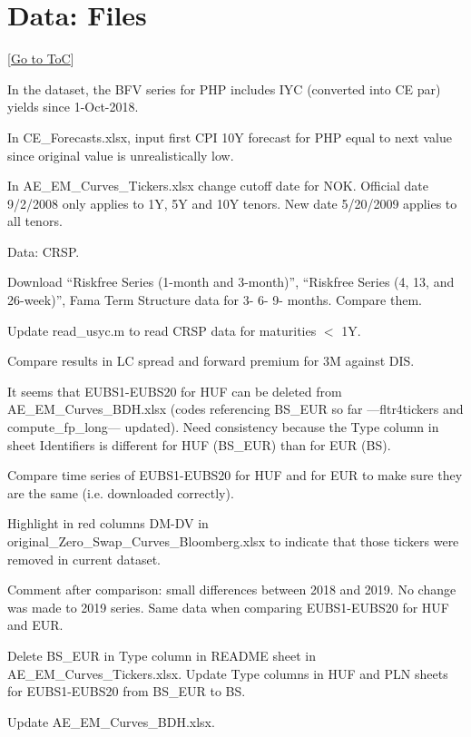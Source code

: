 \documentclass[12pt]{article}
\newcommand{\gototoc}{\vspace{-1.8cm} \null\hfill [\hyperlink{toc}{Go to ToC}] \newline}
\newcommand{\cmark}{\ding{51}}
\newcommand{\done}{\rlap{$\square$}{\raisebox{2pt}{\large\hspace{1pt}\cmark}}%
	\hspace{-2.5pt}}
\begin{document}
\section{Data: Files}
\gototoc
\begin{todolist}
	\item[\done] In the dataset, the BFV series for PHP includes IYC (converted into CE par) yields since 1-Oct-2018. 
	\item[\done] In CE_Forecasts.xlsx, input first CPI 10Y forecast for PHP equal to next value since original value is unrealistically low.
	\item[\done] In AE_EM_Curves_Tickers.xlsx change cutoff date for NOK. Official date 9/2/2008 only applies to 1Y, 5Y and 10Y tenors. New date 5/20/2009 applies to all tenors.
	\item[\done] Data: CRSP.
	\begin{todolist}
		\item[\done] Download “Riskfree Series (1-month and 3-month)”, “Riskfree Series (4, 13, and 26-week)”, Fama Term Structure data for 3- 6- 9- months. Compare them.
		\item[\done] Update read_usyc.m to read CRSP data for maturities $<$ 1Y.
		\item[\done] Compare results in LC spread and forward premium for 3M against DIS.
	\end{todolist}
	\item[\done] It seems that EUBS1-EUBS20 for HUF can be deleted from AE_EM_Curves_BDH.xlsx (codes referencing BS_EUR so far ---fltr4tickers and compute_fp_long--- updated). Need consistency because the Type column in sheet Identifiers is different for HUF (BS_EUR) than for EUR (BS). 
	\begin{todolist}
		\item[\done] Compare time series of EUBS1-EUBS20 for HUF and for EUR to make sure they are the same (i.e. downloaded correctly).
		\item[\done] Highlight in red columns DM-DV in original_Zero_Swap_Curves_Bloomberg.xlsx to indicate that those tickers were removed in current dataset.
		\item[\done] Comment after comparison: small differences between 2018 and 2019. No change was made to 2019 series. Same data when comparing EUBS1-EUBS20 for HUF and EUR.
		\item[\done] Delete BS_EUR in Type column in README sheet in AE_EM_Curves_Tickers.xlsx. Update Type columns in HUF and PLN sheets for EUBS1-EUBS20 from BS_EUR to BS.
		\item[\done] Update AE_EM_Curves_BDH.xlsx.

\end{todolist}
\end{todolist}
\end{document}
